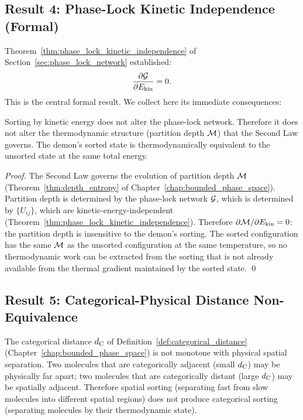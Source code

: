 \subsection{Result 4: Phase-Lock Kinetic Independence (Formal)}

Theorem~\ref{thm:phase_lock_kinetic_independence} of
Section~\ref{sec:phase_lock_network} established:
\begin{equation}
  \frac{\partial \mathcal{G}}{\partial E_{\mathrm{kin}}} = 0.
  \label{eq:formal_orthogonality}
\end{equation}
This is the central formal result. We collect here its immediate consequences:

\begin{corollary}
\label{cor:sorting_irrelevance}
Sorting by kinetic energy does not alter the phase-lock network. Therefore
it does not alter the thermodynamic structure (partition depth $\mathcal{M}$) that
the Second Law governs. The demon's sorted state is thermodynamically equivalent
to the unsorted state at the same total energy.
\end{corollary}

\begin{proof}
The Second Law governs the evolution of partition depth $\mathcal{M}$
(Theorem~\ref{thm:depth_entropy} of Chapter~\ref{chap:bounded_phase_space}).
Partition depth is determined by the phase-lock network $\mathcal{G}$,
which is determined by $\{U_{ij}\}$, which are kinetic-energy-independent
(Theorem~\ref{thm:phase_lock_kinetic_independence}). Therefore $\partial \mathcal{M}
/ \partial E_{\mathrm{kin}} = 0$: the partition depth is insensitive to the
demon's sorting. The sorted configuration has the same $\mathcal{M}$ as the unsorted
configuration at the same temperature, so no thermodynamic work can be extracted
from the sorting that is not already available from the thermal gradient
maintained by the sorted state. \qed
\end{proof}

\subsection{Result 5: Categorical-Physical Distance Non-Equivalence}

\begin{theorem}
\label{thm:cat_phys_distance}
The categorical distance $d_{\mathrm{C}}$ of Definition~\ref{def:categorical_distance}
(Chapter~\ref{chap:bounded_phase_space}) is not monotone with physical spatial
separation. Two molecules that are categorically adjacent (small $d_{\mathrm{C}}$) may
be physically far apart; two molecules that are categorically distant (large
$d_{\mathrm{C}}$) may be spatially adjacent. Therefore spatial sorting (separating fast
from slow molecules into different spatial regions) does not produce categorical
sorting (separating molecules by their thermodynamic state).
\end{theorem}


